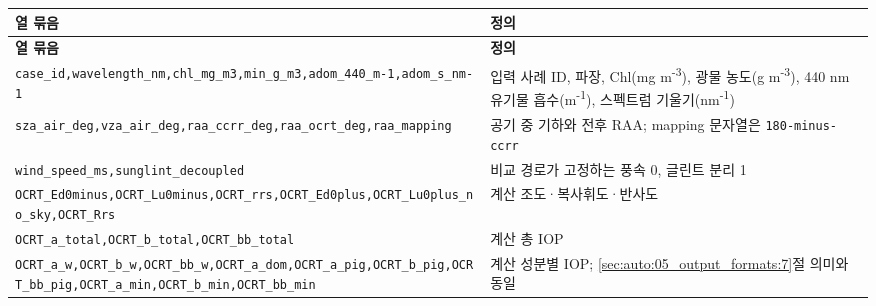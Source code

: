 {\TableFont
\begin{longtable}{@{}>{\raggedright\arraybackslash}p{}>{\raggedright\arraybackslash}p{}@{}}
\toprule
\textbf{열 묶음} & \textbf{정의} \\
\midrule
\endfirsthead
\toprule
\textbf{열 묶음} & \textbf{정의} \\
\midrule
\endhead
\bottomrule
\endfoot
\texttt{case\_\allowbreak{}id,\allowbreak{}wavelength\_\allowbreak{}nm,\allowbreak{}chl\_\allowbreak{}mg\_\allowbreak{}m3,\allowbreak{}min\_\allowbreak{}g\_\allowbreak{}m3,\allowbreak{}adom\_\allowbreak{}440\_\allowbreak{}m-\allowbreak{}1,\allowbreak{}adom\_\allowbreak{}s\_\allowbreak{}nm-\allowbreak{}1} & 입력 사례 ID, 파장, Chl(mg m\textsuperscript{-}\textsuperscript{3}), 광물 농도(g m\textsuperscript{-}\textsuperscript{3}), 440 nm 유기물 흡수(m\textsuperscript{-}\textsuperscript{1}), 스펙트럼 기울기(nm\textsuperscript{-}\textsuperscript{1}) \\
\texttt{sza\_\allowbreak{}air\_\allowbreak{}deg,\allowbreak{}vza\_\allowbreak{}air\_\allowbreak{}deg,\allowbreak{}raa\_\allowbreak{}ccrr\_\allowbreak{}deg,\allowbreak{}raa\_\allowbreak{}ocrt\_\allowbreak{}deg,\allowbreak{}raa\_\allowbreak{}mapping} & 공기 중 기하와 전후 RAA; mapping 문자열은 \texttt{180-\allowbreak{}minus-\allowbreak{}ccrr} \\
\texttt{wind\_\allowbreak{}speed\_\allowbreak{}ms,\allowbreak{}sunglint\_\allowbreak{}decoupled} & 비교 경로가 고정하는 풍속 0, 글린트 분리 1 \\
\texttt{OCRT\_\allowbreak{}Ed0minus,\allowbreak{}OCRT\_\allowbreak{}Lu0minus,\allowbreak{}OCRT\_\allowbreak{}rrs,\allowbreak{}OCRT\_\allowbreak{}Ed0plus,\allowbreak{}OCRT\_\allowbreak{}Lu0plus\_\allowbreak{}no\_\allowbreak{}sky,\allowbreak{}OCRT\_\allowbreak{}Rrs} & 계산 조도·복사휘도·반사도 \\
\texttt{OCRT\_\allowbreak{}a\_\allowbreak{}total,\allowbreak{}OCRT\_\allowbreak{}b\_\allowbreak{}total,\allowbreak{}OCRT\_\allowbreak{}bb\_\allowbreak{}total} & 계산 총 IOP \\
\texttt{OCRT\_\allowbreak{}a\_\allowbreak{}w,\allowbreak{}OCRT\_\allowbreak{}b\_\allowbreak{}w,\allowbreak{}OCRT\_\allowbreak{}bb\_\allowbreak{}w,\allowbreak{}OCRT\_\allowbreak{}a\_\allowbreak{}dom,\allowbreak{}OCRT\_\allowbreak{}a\_\allowbreak{}pig,\allowbreak{}OCRT\_\allowbreak{}b\_\allowbreak{}pig,\allowbreak{}OCRT\_\allowbreak{}bb\_\allowbreak{}pig,\allowbreak{}OCRT\_\allowbreak{}a\_\allowbreak{}min,\allowbreak{}OCRT\_\allowbreak{}b\_\allowbreak{}min,\allowbreak{}OCRT\_\allowbreak{}bb\_\allowbreak{}min} & 계산 성분별 IOP; \ref{sec:auto:05_output_formats:7}절 의미와 동일 \\

\end{longtable}}
